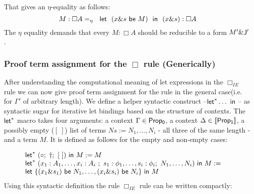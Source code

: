 					That gives an $\eta$-equality as follows:
					{\small
						$$M:\Box A =_{\eta}\ \ {\sf let} \ \ (x \& s\  {\sf be} \ M)\ \ {\sf in}\ \  { (x \& s)}:\Box A$$
					}
					The $\eta$ equality demands that every $M:\Box A$ should be reducible to a form $M'\& {\sf J^{\prime}}$.  
					\subsubsection{Proof term assignment for the $\Box$ rule (Generically)}
					After understanding the computational meaning of let expressions in the $\Box_{IE}$ rule 
					we can now give  proof term assignment  for the rule in the general case(i.e. for $\Gamma'$ of arbitrary length). 
					We define a helper syntactic construct --${\sf let}^{*}\ldots {\ \sf in\ }$-- as syntactic sugar for iterative  let bindings based on the structure  of contexts.
					The ${\sf let}^{*}$ macro takes four arguments: a context $\Gamma\in {\sf Prop_0}$, a  context $\Delta\in{\sf \llbracket Prop_1\rrbracket}$,  
					a possibly empty ($[\ ]$) list of terms  $Ns:=N_1,\ldots,  N_i$ - all three of the same length - and a term $M$. It is defined as follows for the empty and non-empty cases:
					
					{\small
						$$\begin{array}{ll}
						\nonumber {\sf let}^{*}\ (\circ;\ \dagger;\  [\ ]) {\ \sf in\ }  M:= M \  &\\
						\nonumber {\sf let}^{*}\ (x_1:A_1,\ldots, x_i:A_i\ ;\  s_1: \phi_1, \ldots, s_i:\phi_i;\  N_1,\ldots,  N_i) {\ \sf in\ } M:= \  & \\
						{\sf let} \ \{(x_1 \& s_1)\  {\sf be}\  N_1,\ldots,  (x_i \& s_i)\  {\sf be}\  N_i\}\ {\sf in}\  M &\\
						\end{array}$$}
					Using this syntactic definition the rule $\Box_{IE}$ rule  can be written compactly:
					
